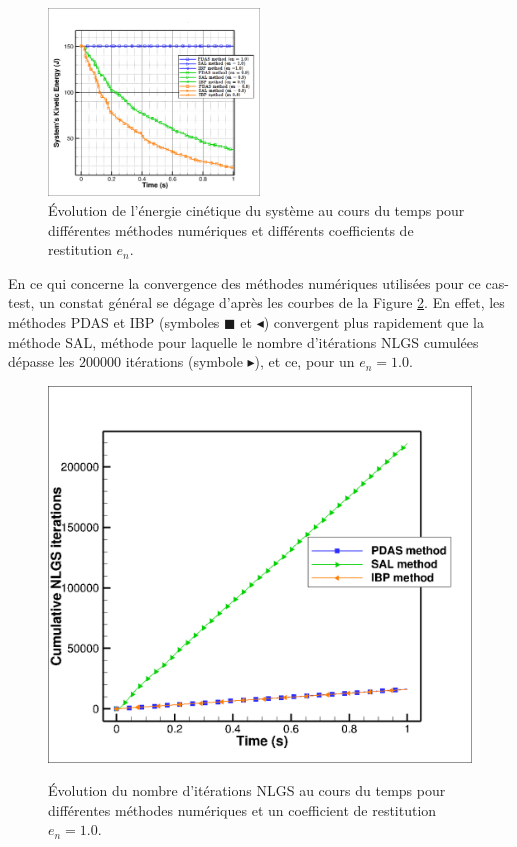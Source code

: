 \begin{figure}[!h]
  \centering
    \includegraphics[width=0.5\textwidth]{chapitres/chapitre_3/figures/ec_it_81_particule_mu=0_en=varied_AS-LG-BP.png}
    \caption{Évolution de l'énergie cinétique du système au cours du temps pour différentes méthodes numériques et différents coefficients de restitution $e_n$.}\label{fig313}
\end{figure}

En ce qui concerne la convergence des méthodes numériques utilisées pour ce cas-test, un constat général se dégage d'après les courbes de la Figure \ref{fig314}. En effet, les méthodes PDAS et IBP (symboles $\blacksquare$ et $\blacktriangleleft$) convergent plus rapidement que la méthode SAL, méthode pour laquelle le nombre d'itérations NLGS cumulées dépasse les $200000$ itérations (symbole $\blacktriangleright$), et ce, pour un $e_n = 1.0$.

\begin{figure}[!h]
  \centering
    \includegraphics[width=0.5\linewidth]{chapitres/chapitre_3/figures/nlgs_it_81_particule_mu=0_en=varied_AS-LG-BP.png}%
        \label{fig:81_nlgs}%
    \caption{Évolution du nombre d'itérations NLGS au cours du temps pour différentes méthodes numériques et un coefficient de restitution $e_n = 1.0$.}\label{fig314}
\end{figure}

